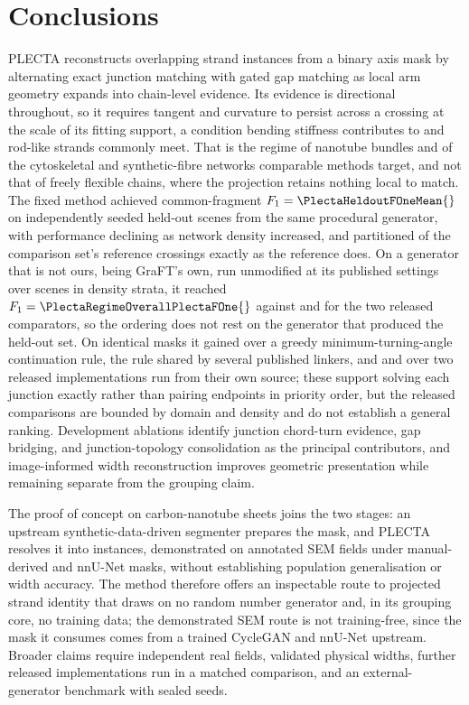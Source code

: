\section{Conclusions}
\label{sec:conclusions}

PLECTA reconstructs overlapping strand instances from a binary axis mask by
alternating exact junction matching with gated gap matching as local arm
geometry expands into chain-level evidence. Its evidence is directional
throughout, so it requires tangent and curvature to persist across a crossing
at the scale of its fitting support, a condition bending stiffness contributes
to and rod-like strands commonly meet. That is the regime of nanotube
bundles and of the cytoskeletal and synthetic-fibre networks comparable
methods target, and not that of freely flexible chains, where the projection
retains nothing local to match. The fixed method achieved
common-fragment $F_1=\PlectaHeldoutFOneMean{}$ on
\PlectaHeldoutSceneCount{} independently seeded held-out scenes from the same
procedural generator, with performance declining as network density increased,
and partitioned \PlectaJunctionPlectaRate{} of the comparison set's reference
crossings exactly as the reference does. On a generator that is not ours, being
GraFT's own, run unmodified at its published settings over
\PlectaRegimeSceneCount{} scenes in \PlectaRegimeStratumCount{} density strata,
it reached $F_1=\PlectaRegimeOverallPlectaFOne{}$ against
\PlectaRegimeOverallGraFTFOne{} and \PlectaRegimeOverallDNAiFOne{} for the two
released comparators, so the ordering does not rest on the generator that
produced the held-out set. On identical masks it gained
\PlectaGreedySweptDeltaFOne{} \Fone{} over a greedy minimum-turning-angle
continuation rule, the rule shared by several published linkers, and
\PlectaDNAiDeltaFOne{} and \PlectaGraFTDeltaFOne{} over two released
implementations run from their own source; these support solving each junction
exactly rather than pairing endpoints in priority order, but the released
comparisons are bounded by domain and density and do not establish a general
ranking. Development ablations identify junction chord-turn evidence, gap
bridging, and junction-topology consolidation as the principal contributors,
and image-informed width reconstruction improves geometric presentation
while remaining separate from the grouping claim.

The proof of concept on carbon-nanotube sheets joins the two stages: an
upstream synthetic-data-driven segmenter prepares the mask, and PLECTA resolves
it into instances, demonstrated on \PlectaRealFieldCount{} annotated SEM fields
under manual-derived and nnU-Net masks, without establishing population
generalisation or width accuracy.
The method therefore offers an inspectable route to projected strand
identity that draws on no random number generator and, in its grouping core,
no training data; the demonstrated SEM route is not training-free, since the
mask it consumes comes from a trained CycleGAN and nnU-Net upstream. Broader claims
require independent real fields, validated physical widths, further released
implementations run in a matched comparison, and an external-generator
benchmark with sealed seeds.
